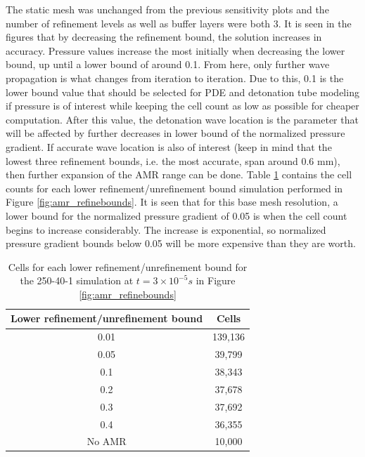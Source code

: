 \noindent The static mesh was unchanged from the previous sensitivity plots and the number of refinement levels as well as buffer layers were both 3. It is seen in the figures that by decreasing the refinement bound, the solution increases in accuracy. Pressure values increase the most initially when decreasing the lower bound, up until a lower bound of around 0.1. From here, only further wave propagation is what changes from iteration to iteration. Due to this, 0.1 is the lower bound value that should be selected for PDE and detonation tube modeling if pressure is of interest while keeping the cell count as low as possible for cheaper computation. After this value, the detonation wave location is the parameter that will be affected by further decreases in lower bound of the normalized pressure gradient. If accurate wave location is also of interest (keep in mind that the lowest three refinement bounds, i.e. the most accurate, span around 0.6 mm), then further expansion of the AMR range can be done. Table \ref{tab:amr_refinebounds} contains the cell counts for each lower refinement/unrefinement bound simulation performed in Figure \ref{fig:amr_refinebounds}. It is seen that for this base mesh resolution, a lower bound for the normalized pressure gradient of 0.05 is when the cell count begins to increase considerably. The increase is exponential, so normalized pressure gradient bounds below 0.05 will be more expensive than they are worth. 

\begin{table}[h]
\centering
\caption{Cells for each lower refinement/unrefinement bound for the 250-40-1 simulation at \(t = 3\times 10^{ - 5} s\) in Figure \ref{fig:amr_refinebounds}}
\label{tab:amr_refinebounds}
\begin{tabular}{cc}
Lower refinement/unrefinement bound & Cells \\ \hline
0.01 & 139,136 \\
0.05 & 39,799 \\
0.1 & 38,343 \\ 
0.2 & 37,678 \\
0.3 & 37,692 \\ 
0.4 & 36,355 \\
No AMR & 10,000 \\
\end{tabular}
\end{table}

